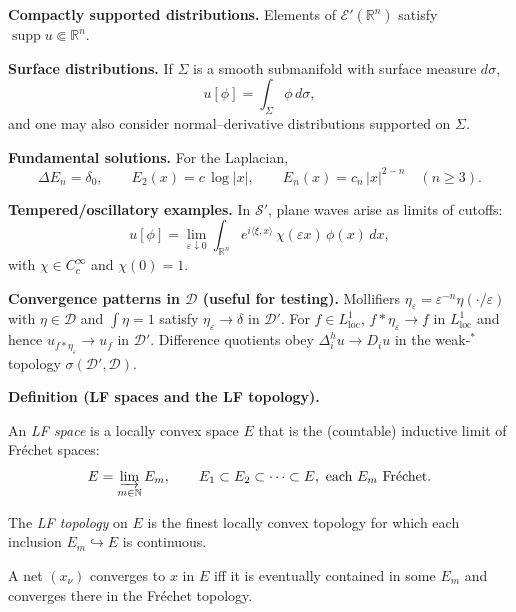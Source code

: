 \begin{problem}[CP-III-0024]
\medskip

\textbf{Compactly supported distributions.}
Elements of $\mathcal E'(\mathbb R^n)$ satisfy $\operatorname{supp}u\Subset\mathbb R^n$.

\medskip

\textbf{Surface distributions.}
If $\Sigma$ is a smooth submanifold with surface measure $d\sigma$,
\[
u[\phi]=\int_{\Sigma}\phi\,d\sigma ,
\]
and one may also consider normal–derivative distributions supported on $\Sigma$.

\medskip

\textbf{Fundamental solutions.}
For the Laplacian,
\[
\Delta E_n=\delta_0,\qquad
E_2(x)=c\,\log|x|,\qquad
E_n(x)=c_n\,|x|^{2-n}\quad(n\ge3).
\]

\medskip

\textbf{Tempered/oscillatory examples.}
In $\mathcal S'$, plane waves arise as limits of cutoffs:
\[
u[\phi]=\lim_{\varepsilon\downarrow0}\int_{\mathbb R^n}
e^{i\langle\xi,x\rangle}\,\chi(\varepsilon x)\,\phi(x)\,dx ,
\]
with $\chi\in C_c^\infty$ and $\chi(0)=1$.


\bigskip

\par\smallskip\noindent\textbf{Convergence patterns in $\mathcal D$ (useful for testing).}\quad
Mollifiers $\eta_\varepsilon=\varepsilon^{-n}\eta(\cdot/\varepsilon)$ with $\eta\in\mathcal D$ and $\int\eta=1$ satisfy $\eta_\varepsilon\to\delta$ in $\mathcal D'$.
For $f\in L^1_{\mathrm{loc}}$, $f\ast\eta_\varepsilon\to f$ in $L^1_{\mathrm{loc}}$ and hence $u_{f\ast\eta_\varepsilon}\to u_f$ in $\mathcal D'$.
Difference quotients obey $\Delta_i^h u\to D_i u$ in the weak-$^\ast$ topology $\sigma(\mathcal D',\mathcal D)$.

\bigskip

\par\smallskip\noindent\textbf{Definition (LF spaces and the LF topology).}\quad

\smallskip

An \emph{LF space} is a locally convex space $E$ that is the (countable) inductive limit of Fr\'echet spaces:
\[
E=\varinjlim_{m\in\mathbb N} E_m, \qquad
E_1 \subset E_2 \subset \cdots \subset E, \ \text{each $E_m$ Fr\'echet.}
\]

\smallskip

The \emph{LF topology} on $E$ is the finest locally convex topology for which each inclusion
$E_m \hookrightarrow E$ is continuous.

\smallskip

A net $(x_\nu)$ converges to $x$ in $E$ iff it is eventually contained in some $E_m$
and converges there in the Fr\'echet topology.


\end{problem}
